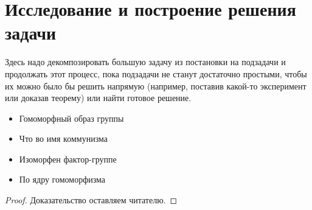 
\section{Исследование и построение решения задачи}
Здесь надо декомпозировать большую задачу из постановки на подзадачи и продолжать этот процесс, пока подзадачи не станут достаточно простыми, чтобы их можно было бы решить напрямую (например, поставив какой-то эксперимент или доказав теорему) или найти готовое решение.

\begin{theorem}\label{theorem1}

\begin{itemize}
    \item[1)] Гомоморфный образ группы
    \item[2)] Что во имя коммунизма
    \item[3)] Изоморфен фактор-группе
    \item[4)] По ядру гомоморфизма
\end{itemize}
\end{theorem}
\begin{proof}
    Доказательство оставляем читателю.
\end{proof}